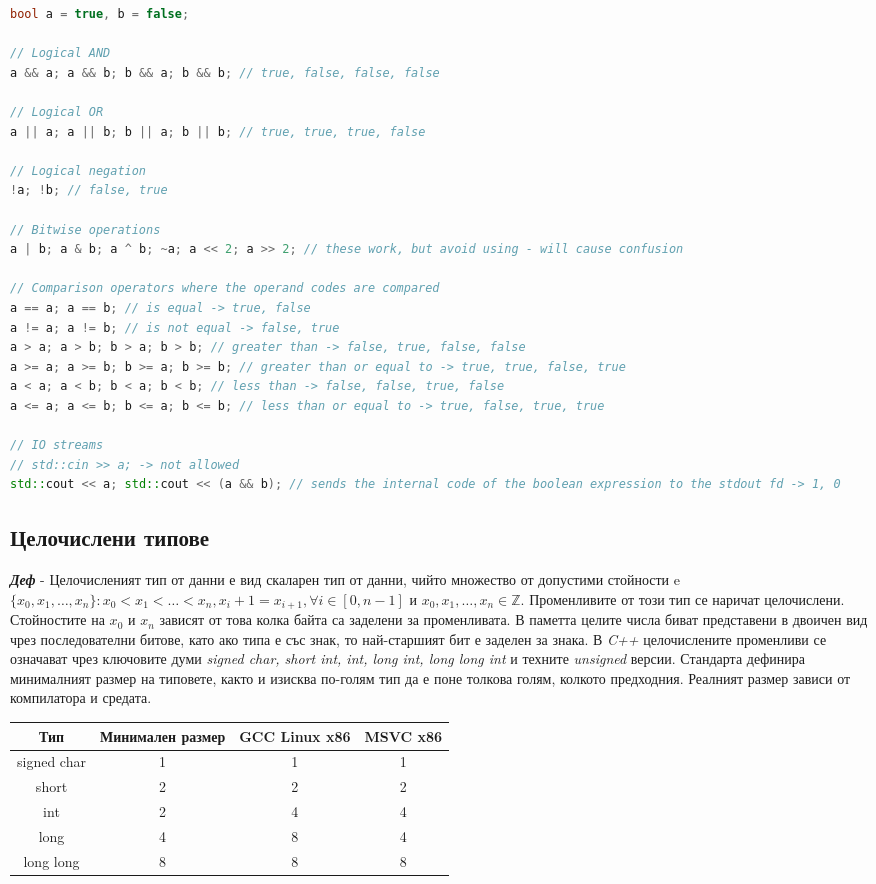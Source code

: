 \documentclass[fleqn,12pt]{article}
\begin{document}
\begin{lstlisting}[language=C++, caption=Bool operators]
bool a = true, b = false;

// Logical AND
a && a; a && b; b && a; b && b; // true, false, false, false

// Logical OR
a || a; a || b; b || a; b || b; // true, true, true, false

// Logical negation
!a; !b; // false, true

// Bitwise operations
a | b; a & b; a ^ b; ~a; a << 2; a >> 2; // these work, but avoid using - will cause confusion

// Comparison operators where the operand codes are compared
a == a; a == b; // is equal -> true, false
a != a; a != b; // is not equal -> false, true
a > a; a > b; b > a; b > b; // greater than -> false, true, false, false
a >= a; a >= b; b >= a; b >= b; // greater than or equal to -> true, true, false, true
a < a; a < b; b < a; b < b; // less than -> false, false, true, false
a <= a; a <= b; b <= a; b <= b; // less than or equal to -> true, false, true, true

// IO streams
// std::cin >> a; -> not allowed
std::cout << a; std::cout << (a && b); // sends the internal code of the boolean expression to the stdout fd -> 1, 0
\end{lstlisting}

\subsection{Целочислени типове}

\noindent \textit{\textbf{Деф}} - Целочисленият тип от данни е вид скаларен тип от данни, чийто множество от допустими стойности e $\{x_0, x_1, \dots, x_n\}: x_0 < x_1 < \dots < x_n, x_i + 1 = x_{i+1}, \forall i \in [0, n-1]$ и $x_0, x_1, \dots, x_n \in \mathbb{Z}$.
Променливите от този тип се наричат целочислени. Стойностите на $x_0$ и $x_n$ зависят от това колка байта са заделени за променливата.
В паметта целите числа биват представени в двоичен вид чрез последователни битове, като ако типа е със знак, то най-старшият бит е заделен за знака.
\bigbreak
В \textit{C++} целочислените променливи се означават чрез ключовите думи \textit{signed char, short int, int, long int, long long int} и техните \textit{unsigned} версии.
Стандарта дефинира минималният размер на типовете, както и изисква по-голям тип да е поне толкова голям, колкото предходния. Реалният размер зависи от компилатора и средата.

\begin{tabular}{ |c|c|c|c| } 
\hline
Тип & Минимален размер & GCC Linux x86 & MSVC x86 \\ 
\hline
signed char & 1 & 1 & 1 \\ 
\hline
short & 2 & 2 & 2 \\ 
\hline
int & 2 & 4 & 4 \\ 
\hline
long & 4 & 8 & 4 \\ 
\hline
long long & 8 & 8 & 8 \\ 
\hline
\end{tabular}
\end{document}
